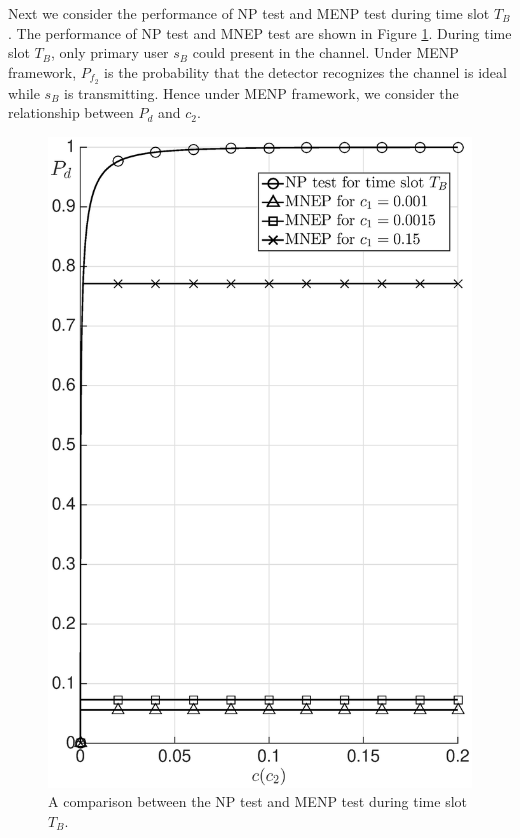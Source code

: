 Next we consider the performance of NP test and MENP test during time slot $T_B$.
The performance of NP test and MNEP test are shown in Figure \ref{pic:20150704a0}. During time slot $T_B$, only primary user $s_B$ could present in the channel. Under MENP framework, $P_{f_2}$ is the probability that the detector recognizes the channel is ideal while $s_B$ is transmitting. Hence under MENP framework, we consider the relationship between $P_d$ and $c_2$.

\begin{figure}[!hbp]
  \centering
  \includegraphics[width = 12cm]{5/SIb.eps}
  \caption{A comparison between the NP test and MENP test during time slot $T_B$.} 
  \label{pic:20150704a0}
\end{figure} 

